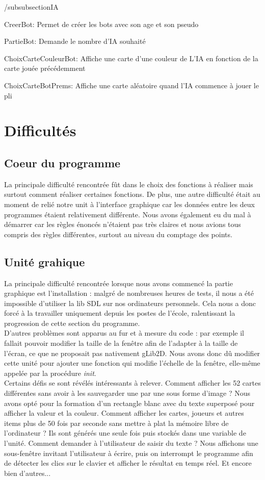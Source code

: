 \documentclass[12pt]{report}
\begin{document}
  /subsubsection{IA}
  	\item[CreerBot:] Permet de créer les bots avec son age et son pseudo
	\item[PartieBot:] Demande le nombre d'IA souhaité
	\item[ChoixCarteCouleurBot:] Affiche une carte d'une couleur de L'IA en fonction de la carte jouée précédemment
	\item[ChoixCarteBotPrems:] Affiche une carte aléatoire quand l'IA commence à jouer le pli
	
\section{Difficultés}
	\subsection{Coeur du programme}
	La principale difficulté rencontrée fût dans le choix des fonctions à réaliser mais surtout comment réaliser certaines fonctions. De plus, une autre difficulté était au moment de relié notre unit à l'interface graphique car les données entre les deux programmes étaient relativement différente. Nous avons également eu du mal à démarrer car les règles énoncés n'étaient pas très claires et nous avions tous compris des règles différentes, surtout au niveau du comptage des points.
	
	\subsection{Unité grahique}
	La principale difficulté rencontrée lorsque nous avons commencé la partie graphique est l'installation : malgré de nombreuses heures de tests, il nous a été impossible d'utiliser la lib SDL sur nos ordinateurs personnels. Cela nous a donc forcé à la travailler uniquement depuis les postes de l'école, ralentissant la progression de cette section du programme.\\ 
	
	D'autres problèmes sont apparus au fur et à mesure du code : par exemple il fallait pouvoir modifier la taille de la fenêtre afin de l'adapter à la taille de l'écran, ce que ne proposait pas nativement gLib2D. Nous avons donc dû modifier cette unité pour ajouter une fonction qui modifie l'échelle de la fenêtre, elle-même appelée par la procédure \textit{init}. \\
	\clearpage
	Certains défis se sont révélés intéressants à relever. Comment afficher les 52 cartes différentes sans avoir à les sauvegarder une par une sous forme d'image ? Nous avons opté pour la formation d'un rectangle blanc avec du texte superposé pour afficher la valeur et la couleur. Comment afficher les cartes, joueurs et autres items plus de 50 fois par seconde sans mettre à plat la mémoire libre de l'ordinateur ? Ils sont générés une seule fois puis stockés dans une variable de l'unité. Comment demander à l'utilisateur de saisir du texte ? Nous affichons une sous-fenêtre invitant l'utilisateur à écrire, puis on interrompt le programme afin de détecter les clics sur le clavier et afficher le résultat en temps réel. Et encore bien d'autres...
\end{document}
